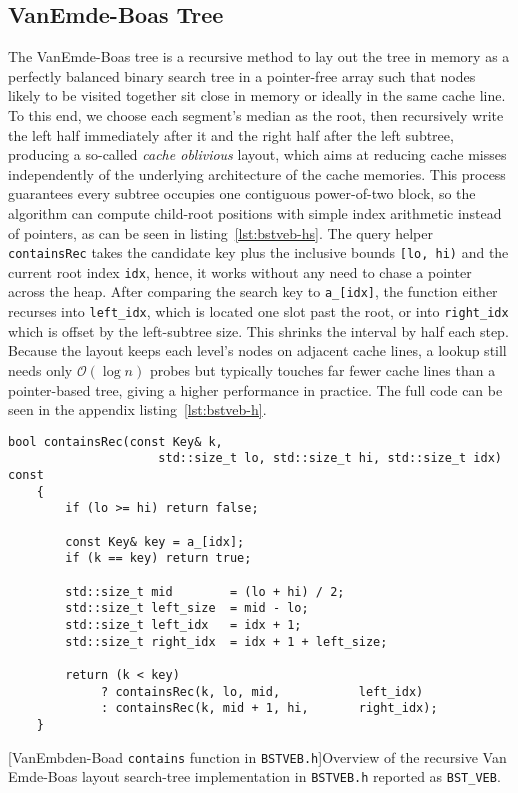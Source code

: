 \documentclass{article}
\begin{document}
\subsection{VanEmde-Boas Tree}
The VanEmde-Boas tree is a recursive method to lay out the tree in memory as a perfectly balanced binary search tree in a pointer-free array such that nodes likely to be visited together sit close in memory or ideally in the same cache line. To this end, we choose each segment’s median as the root, then recursively write the left half immediately after it and the right half after the left subtree, producing a so-called \textit{cache oblivious} layout, which aims at reducing cache misses independently of the underlying architecture of the cache memories. This process guarantees every subtree occupies one contiguous power-of-two block, so the algorithm can compute child-root positions with simple index arithmetic instead of pointers, as can be seen in listing~\ref{lst:bstveb-hs}. The query helper \texttt{containsRec} takes the candidate key plus the inclusive bounds \texttt{[lo, hi)} and the current root index \texttt{idx}, hence, it works without any need to chase a pointer across the heap. After comparing the search key to \texttt{a\_[idx]}, the function either recurses into \texttt{left\_idx}, which is located one slot past the root, or into \texttt{right\_idx} which is offset by the left-subtree size. This shrinks the interval by half each step. Because the layout keeps each level’s nodes on adjacent cache lines, a lookup still needs only $\mathcal{O}(\log n)$ probes but typically touches far fewer cache lines than a pointer-based tree, giving a higher performance in practice. The full code can be seen in the appendix listing~\ref{lst:bstveb-h}.
\begin{lstlisting}
bool containsRec(const Key& k,
                     std::size_t lo, std::size_t hi, std::size_t idx) const
    {
        if (lo >= hi) return false;            

        const Key& key = a_[idx];
        if (k == key) return true;

        std::size_t mid        = (lo + hi) / 2;
        std::size_t left_size  = mid - lo;    
        std::size_t left_idx   = idx + 1;   
        std::size_t right_idx  = idx + 1 + left_size;

        return (k < key)
             ? containsRec(k, lo, mid,           left_idx)
             : containsRec(k, mid + 1, hi,       right_idx);
    }
\end{lstlisting}
[VanEmbden-Boad \texttt{contains} function in \texttt{BSTVEB.h}]{Overview of the recursive Van Emde-Boas layout search-tree implementation in \texttt{BSTVEB.h} reported as \texttt{BST\_VEB}.}
\label{lst:bstveb-hs}
\end{document}
